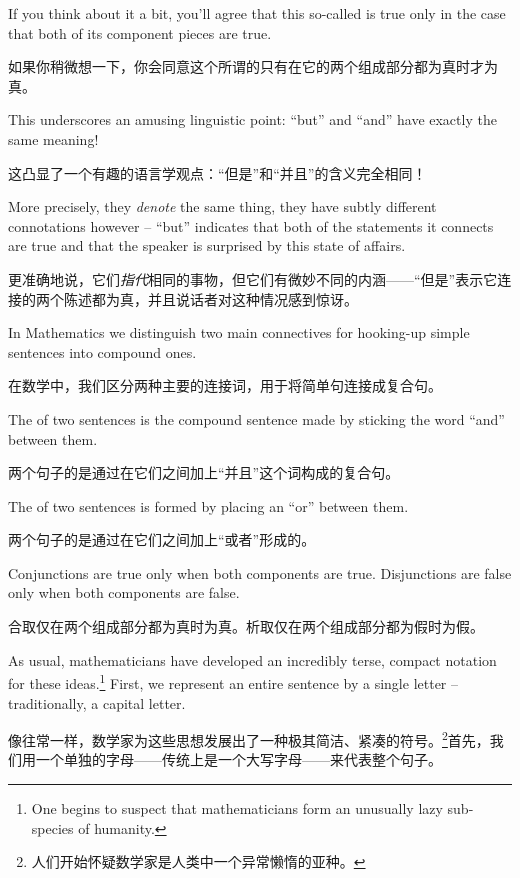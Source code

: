 If you think about it a bit, you'll agree that
this so-called  is true 
only in the case that both
of its component pieces are true.

如果你稍微想一下，你会同意这个所谓的只有在它的两个组成部分都为真时才为真。

This underscores an amusing linguistic
point: ``but'' and ``and'' have exactly the same meaning!

这凸显了一个有趣的语言学观点：“但是”和“并且”的含义完全相同！

More precisely,
they {\em denote} the same thing, they have subtly different connotations
however -- ``but'' indicates that both of the statements it connects
are true and that the speaker is surprised by this state of affairs.

更准确地说，它们{\em 指代}相同的事物，但它们有微妙不同的内涵——“但是”表示它连接的两个陈述都为真，并且说话者对这种情况感到惊讶。

In Mathematics we distinguish two main connectives for hooking-up simple
sentences into compound ones.

在数学中，我们区分两种主要的连接词，用于将简单句连接成复合句。

The  
of two sentences is
the compound sentence made by sticking the word ``and'' between them.

两个句子的是通过在它们之间加上“并且”这个词构成的复合句。

The  of two sentences is 
formed by placing an ``or'' 
between them.

两个句子的是通过在它们之间加上“或者”形成的。

Conjunctions are true only when both components are true.
Disjunctions are false only when both components are false.

合取仅在两个组成部分都为真时为真。析取仅在两个组成部分都为假时为假。

As usual, mathematicians have developed an incredibly terse, compact
notation for these ideas.\footnote{One begins to suspect that %
mathematicians form an unusually lazy sub-species of humanity. }  
First, we represent an
entire sentence by a single letter -- traditionally, a capital letter.

像往常一样，数学家为这些思想发展出了一种极其简洁、紧凑的符号。\footnote{人们开始怀疑数学家是人类中一个异常懒惰的亚种。}首先，我们用一个单独的字母——传统上是一个大写字母——来代表整个句子。

